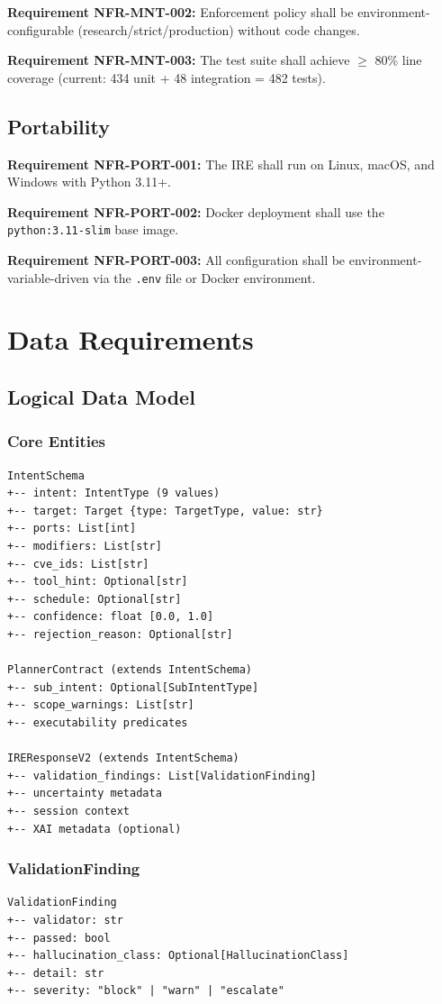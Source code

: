\documentclass[10pt,journal,onecolumn]{IEEEtran}
\newcommand{\reqid}[1]{\textbf{#1}}
\begin{document}
\reqid{Requirement NFR-MNT-002:} Enforcement policy shall be environment-configurable (research/strict/production) without code changes.

\reqid{Requirement NFR-MNT-003:} The test suite shall achieve $\geq$ 80\% line coverage (current: 434 unit + 48 integration = 482 tests).

\subsection{Portability}
\reqid{Requirement NFR-PORT-001:} The IRE shall run on Linux, macOS, and Windows with Python 3.11+.

\reqid{Requirement NFR-PORT-002:} Docker deployment shall use the \texttt{python:3.11-slim} base image.

\reqid{Requirement NFR-PORT-003:} All configuration shall be environment-variable-driven via the \texttt{.env} file or Docker environment.
\section{Data Requirements}

\subsection{Logical Data Model}

\subsubsection{Core Entities}
\begin{lstlisting}
IntentSchema
+-- intent: IntentType (9 values)
+-- target: Target {type: TargetType, value: str}
+-- ports: List[int]
+-- modifiers: List[str]
+-- cve_ids: List[str]
+-- tool_hint: Optional[str]
+-- schedule: Optional[str]
+-- confidence: float [0.0, 1.0]
+-- rejection_reason: Optional[str]

PlannerContract (extends IntentSchema)
+-- sub_intent: Optional[SubIntentType]
+-- scope_warnings: List[str]
+-- executability predicates

IREResponseV2 (extends IntentSchema)
+-- validation_findings: List[ValidationFinding]
+-- uncertainty metadata
+-- session context
+-- XAI metadata (optional)
\end{lstlisting}

\subsubsection{ValidationFinding}
\begin{lstlisting}
ValidationFinding
+-- validator: str
+-- passed: bool
+-- hallucination_class: Optional[HallucinationClass]
+-- detail: str
+-- severity: "block" | "warn" | "escalate"
\end{lstlisting}
\end{document}
